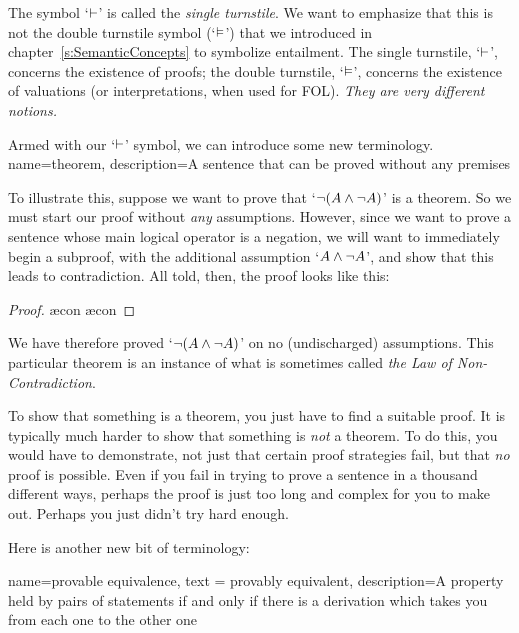 The symbol `$\vdash$' is called the \emph{single turnstile}. We want to emphasize that this is not the {double turnstile} symbol (`$\vDash$') that we introduced in chapter~\ref{s:SemanticConcepts} to symbolize entailment. The single turnstile, `$\vdash$', concerns the existence of proofs; the double turnstile, `$\vDash$', concerns the existence of valuations (or interpretations, when used for FOL). \emph{They are very different notions.}

Armed with our `$\vdash$' symbol, we can introduce some new terminology.
{
name=theorem,
description={A sentence that can be proved without any premises}
}

        To illustrate this, suppose we want to prove that `$\neg (A \wedge \neg A)$' is a theorem. So we must start our proof without \emph{any} assumptions. However, since we want to prove a sentence whose main logical operator is a negation, we will want to  immediately begin a subproof, with the additional assumption `$A \wedge \neg A$', and show that this leads to contradiction. All told, then, the proof looks like this:
	\begin{proof}
		\open
			\ae{con}
			\ae{con}
		\close
	\end{proof}
We have therefore proved `$\neg (A \wedge \neg A)$' on no (undischarged) assumptions. This particular theorem is an instance of what is sometimes called \emph{the Law of Non-Contradiction}.

To show that something is a theorem, you just have to find a suitable proof. It is typically much harder to show that something is \emph{not} a theorem. To do this, you would have to demonstrate, not just that certain proof strategies fail, but that \emph{no} proof is possible. Even if you fail in trying to prove a sentence in a thousand different ways, perhaps the proof is just too long and complex for you to make out. Perhaps you just didn't try hard enough.

Here is another new bit of terminology:
        
{
  name=provable equivalence,
  text = provably equivalent,
description={A property held by pairs of statements if and only if there is a derivation which takes you from each one to the other one}
}


